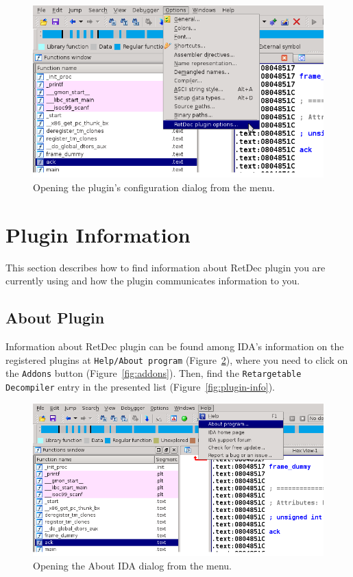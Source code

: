 \documentclass[pdftex, a4paper,12pt, oneside, svgnames]{article}
\begin{document}
\begin{figure}[!ht]
	\centering
	\includegraphics[width=12cm]{figures/menu-config-cut}
	\caption{Opening the plugin's configuration dialog from the menu.}
	\label{fig:config-menu}
\end{figure}

\section{Plugin Information}
\label{sec:plugin-info}
This section describes how to find information about RetDec plugin you are currently using and how the plugin communicates information to you.

\subsection{About Plugin}
Information about RetDec plugin can be found among IDA's information on the registered plugins at \texttt{Help/About program} (Figure~\ref{fig:about-ida}), where you need to click on the \texttt{Addons} button (Figure~\ref{fig:addons}). Then, find the \texttt{Retargetable Decompiler} entry in the presented list (Figure~\ref{fig:plugin-info}).

\begin{figure}[!ht]
	\centering
	\includegraphics[width=12cm]{figures/help-about-program-cut}
	\caption{Opening the About IDA dialog from the menu.}
	\label{fig:about-ida}
\end{figure}
\end{document}
